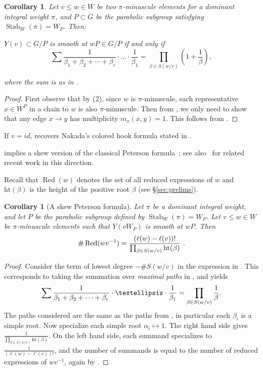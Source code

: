 \documentclass[11pt]{article}
\newtheorem{corol}[theo]{Corollary}
\theoremstyle{definition}
\numberwithin{equation}{section}
\newcommand{\h}{\mathrm{ht}}
\DeclareMathOperator{\Red}{Red}
\DeclareMathOperator{\Stab}{Stab}
\begin{document}
\begin{corol}\label{col:Nak} 
	Let $v \le w \in W$ be two $\pi$-minuscule elements for a dominant integral weight $\pi$,
	and $P\subset G$ be the parabolic subgroup satisfying 
	$\Stab_W(\pi)=W_P$. Then: 
	\begin{center}
		$Y(v)\subset G/P$ is smooth at $wP\in G/P$  if and only if
		\begin{equation}\label{E:minusculeNak}
			\sum \frac{1}{\beta_1+\beta_2+\cdots +\beta_r} \cdot \ldots \cdot 
			\frac{1}{\beta_1}
			=\prod_{\beta \in S(w/v)}\left(1+\frac{1}{\beta}\right),
		\end{equation}
	\end{center}
	where the sum is as in .
\end{corol}
\begin{proof} First observe that by (2), 
	since $w$ is $\pi$-minuscule, each representative $x \in W^P$ in a chain to $w$ 
	is also $\pi$-minuscule. Then from , we only need to show that 
	any edge $x \to y$ has multiplicity $m_\pi(x,y)=1$. This follows from .
\end{proof}
If $v=id$,  recovers Nakada's colored hook formula stated in . 

 implies 
a skew version of the classical Peterson formula~\cite{carrell:vector,proctor:minuscule};
see also~\cite{kleschchev.ram} for related recent work in this direction.

Recall that $\Red(w)$ 
denotes the set of all reduced expressions of $w$ and $\h(\beta)$ is the height of the positive root $\beta$ (see \S\ref{sec:prelims}).
\begin{corol}[A skew Peterson formula]\label{cor:skewPP} Let $\pi$ be a 
	dominant integral weight, and let $P$ be the parabolic subgroup defined by
	$\Stab_W(\pi)=W_P$. Let $v \le w\in W$ be $\pi$-minuscule elements 
	such that
	$Y(vW_P)$ is smooth at $wP$. Then
	\begin{equation}\label{equ:petersonproctor}
		\#\Red(wv^{-1})=\frac{(\ell(w)-\ell(v))!}{\prod_{\beta\in S(w/v)}\h(\beta)} ~\/.
	\end{equation}
\end{corol}
\begin{proof} Consider the term of lowest degree $-\# S(w/v)$ in the expression in . This corresponds to taking the summation over {\em maximal paths} in , and yields
	\begin{equation}\label{eq:max_path}
		\sum \frac{1}{\beta_1+\beta_2+\cdots +\beta_r} \cdot \ldots \cdot 
		\frac{1}{\beta_1}
		=\prod_{\beta \in S(w/v)} \frac{1}{\beta} \/.
	\end{equation}
	The paths considered are the same as the paths from , in particular each $\beta_i$ 
	is a simple root. Now specialize each simple root $\alpha_i \mapsto 1$. The right hand side gives $\frac{1}{\prod_{\beta\in S(w/v)}\h(\beta)}$. On the left hand side, each summand specializes to $\frac{1}{ (\ell(w)-\ell(v)) !}$, and the number of summands is equal to the number of reduced expressions of $wv^{-1}$, again by 
	.\end{proof}
\end{document}
